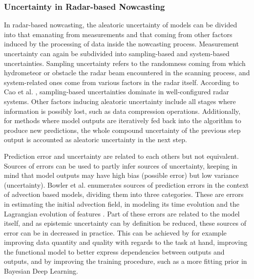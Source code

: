 \subsubsection*{Uncertainty in Radar-based Nowcasting}

In radar-based nowcasting, the aleatoric uncertainty of models can be divided into that emanating from measurements and that coming from other factors induced by the processing of data inside the nowcasting process. Measurement uncertainty can again be subdivided into sampling-based and system-based uncertainties. Sampling uncertainty refers to the randomness coming from which hydrometeor or obstacle the radar beam encountered in the scanning process, and system-related ones come from various factors in the radar itself. According to Cao et al. \cite{cao_measurement_2016}, sampling-based uncertainties dominate in well-configured radar systems. Other factors inducing aleatoric uncertainty include all stages where information is possibly lost, such as data compression operations. Additionally, for methods where model outputs are iteratively fed back into the algorithm to produce new predictions, the whole compound uncertainty of the previous step output is accounted as aleatoric uncertainty in the next step. 


Prediction error and uncertainty are related to each others but not equivalent. Sources of errors can be used to partly infer sources of uncertainty, keeping in mind that model outputs may have high bias (possible error) but low variance (uncertainty). Bowler et al. enumerates sources of prediction errors in the context of advection based models, dividing them into three categories. These are errors in estimating the initial advection field, in modeling its time evolution and the Lagrangian evolution of features \cite{bowler_steps_2006}. Part of these errors are related to the model itself, and as epistemic uncertainty can by definition be reduced, these sources of error can be in decreased in practice. This can be achieved by for example improving data quantity and quality with regards to the task at hand, improving the functional model to better express dependencies between outputs and outputs, and by improving the training procedure, such as a more fitting prior in Bayesian Deep Learning. 


